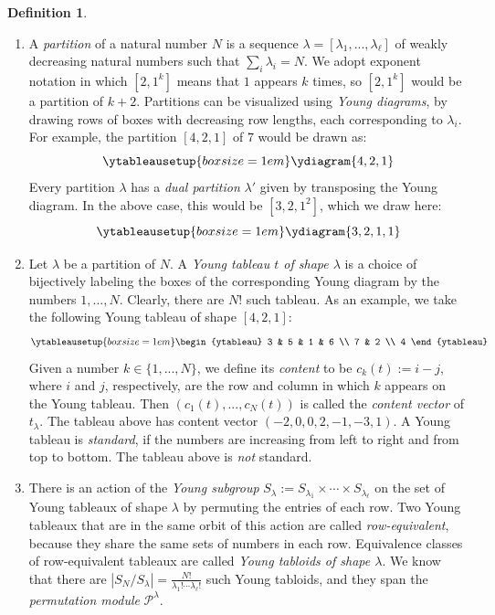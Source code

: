 \documentclass[11pt]{report}
\theoremstyle{definition}
\newtheorem{definition}[theorem]{Definition}
\theoremstyle{remark}
\theoremstyle{remark}
\begin{document}
\begin{definition}
\begin{enumerate}[label=(\roman*)]
\item A \emph{partition} of a natural number $N$ is a sequence $\lambda = [\lambda_1,...,\lambda_\ell]$ of weakly decreasing natural numbers such that $\sum_i \lambda_i = N$. We adopt exponent notation in which $[2,1^k]$ means that $1$ appears $k$ times, so $[2,1^k]$ would be a partition of $k+2$. Partitions can be visualized using \emph{Young diagrams}, by drawing rows of boxes with decreasing row lengths, each corresponding to $\lambda_i$. For example, the partition $[4,2,1]$ of $7$ would be drawn as:
\begin{equation*}
\ytableausetup{boxsize=1em}
\ydiagram{4,2,1}
\end{equation*}
Every partition $\lambda$ has a \emph{dual partition} $\lambda'$ given by transposing the Young diagram. In the above case, this would be $[3,2,1^2]$, which we draw here:
\begin{equation*}
\ytableausetup{boxsize=1em}
\ydiagram{3,2,1,1}
\end{equation*}
\item Let $\lambda$ be a partition of $N$. A \emph{Young tableau $t$ of shape $\lambda$} is a choice of bijectively labeling the boxes of the corresponding Young diagram by the numbers $1,...,N$. Clearly, there are $N!$ such tableau. As an example, we take the following Young tableau of shape $[4,2,1]$:
\begin{equation*}
\ytableausetup{boxsize=1em}
\begin{ytableau}
3 & 5 & 1 & 6 \\
7 & 2 \\
4
\end{ytableau}
\end{equation*}
Given a number $k \in \{ 1,...,N \}$, we define its \emph{content} to be $c_k(t) := i - j$, where $i$ and $j$, respectively, are the row and column in which $k$ appears on the Young tableau. Then $(c_1(t),...,c_N(t))$ is called the \emph{content vector} of $t_\lambda$. The tableau above has content vector $(-2,0,0,2,-1,-3,1)$. A Young tableau is \emph{standard}, if the numbers are increasing from left to right and from top to bottom. The tableau above is \emph{not} standard.
\item There is an action of the \emph{Young subgroup} $S_\lambda := S_{\lambda_1} \times \cdots \times S_{\lambda_\ell}$ on the set of Young tableaux of shape $\lambda$ by permuting the entries of each row. Two Young tableaux that are in the same orbit of this action are called \emph{row-equivalent}, because they share the same sets of numbers in each row. Equivalence classes of row-equivalent tableaux are called \emph{Young tabloids of shape $\lambda$}. We know that there are $|S_N/S_\lambda| = \frac{N!}{\lambda_1! \cdots \lambda_\ell!}$ such Young tabloids, and they span the \emph{permutation module} $\mathcal{P}^\lambda$.

\end{enumerate}
\end{definition}
\end{document}
